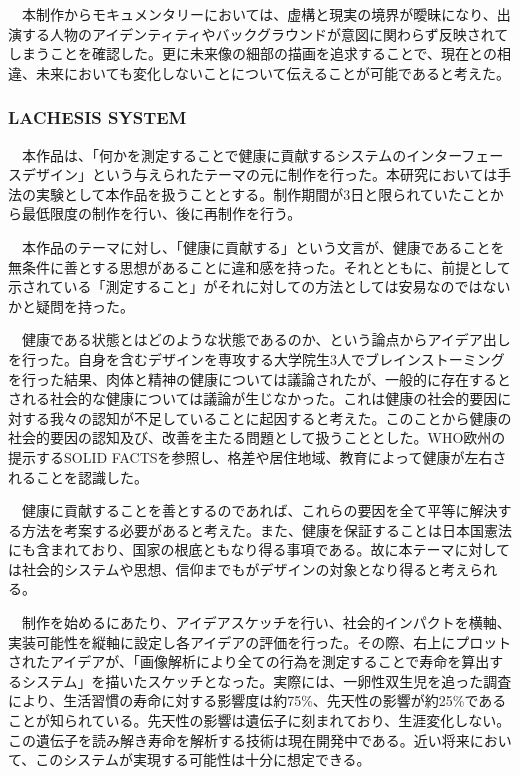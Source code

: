 　本制作からモキュメンタリーにおいては、虚構と現実の境界が曖昧になり、出演する人物のアイデンティティやバックグラウンドが意図に関わらず反映されてしまうことを確認した。更に未来像の細部の描画を追求することで、現在との相違、未来においても変化しないことについて伝えることが可能であると考えた。

\subsubsection{LACHESIS SYSTEM}
　本作品は、「何かを測定することで健康に貢献するシステムのインターフェースデザイン」という与えられたテーマの元に制作を行った。本研究においては手法の実験として本作品を扱うこととする。制作期間が3日と限られていたことから最低限度の制作を行い、後に再制作を行う。

　本作品のテーマに対し、「健康に貢献する」という文言が、健康であることを無条件に善とする思想があることに違和感を持った。それとともに、前提として示されている「測定すること」がそれに対しての方法としては安易なのではないかと疑問を持った。

　健康である状態とはどのような状態であるのか、という論点からアイデア出しを行った。自身を含むデザインを専攻する大学院生3人でブレインストーミングを行った結果、肉体と精神の健康については議論されたが、一般的に存在するとされる社会的な健康については議論が生じなかった。これは健康の社会的要因に対する我々の認知が不足していることに起因すると考えた。このことから健康の社会的要因の認知及び、改善を主たる問題として扱うこととした。WHO欧州の提示するSOLID FACTSを参照し、格差や居住地域、教育によって健康が左右されることを認識した。

　健康に貢献することを善とするのであれば、これらの要因を全て平等に解決する方法を考案する必要があると考えた。また、健康を保証することは日本国憲法にも含まれており、国家の根底ともなり得る事項である。故に本テーマに対しては社会的システムや思想、信仰までもがデザインの対象となり得ると考えられる。

　制作を始めるにあたり、アイデアスケッチを行い、社会的インパクトを横軸、実装可能性を縦軸に設定し各アイデアの評価を行った。その際、右上にプロットされたアイデアが、「画像解析により全ての行為を測定することで寿命を算出するシステム」を描いたスケッチとなった。実際には、一卵性双生児を追った調査により、生活習慣の寿命に対する影響度は約75\%、先天性の影響が約25\%であることが知られている。先天性の影響は遺伝子に刻まれており、生涯変化しない。この遺伝子を読み解き寿命を解析する技術は現在開発中である。近い将来において、このシステムが実現する可能性は十分に想定できる。

